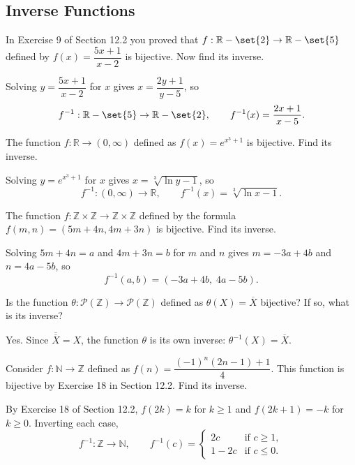\documentclass[DIN, pagenumber=false, fontsize=11pt, parskip=half]{scrartcl}
\begin{document}
\subsection{Inverse Functions}

\begin{problems}
    \problem In Exercise 9 of Section 12.2 you proved that $f : \mathbb{R} - \set{2} \to \mathbb{R} - \set{5}$ defined by $f(x) = \dfrac{5x+1}{x-2}$ is bijective. Now find its inverse.

    \answer Solving $y = \dfrac{5x+1}{x-2}$ for $x$ gives $x = \dfrac{2y+1}{y-5}$, so
    \[
        f^{-1} : \mathbb{R} - \set{5} \to \mathbb{R} - \set{2}, \qquad f^{-1}(x) = \dfrac{2x+1}{x-5}.
    \]

    \problem The function $f : \mathbb{R} \to (0,\infty)$ defined as $f(x) = e^{x^3+1}$ is bijective. Find its inverse.

    \answer Solving $y = e^{x^3+1}$ for $x$ gives $x = \sqrt[3]{\ln{y}-1}$, so
    \[
        f^{-1} : (0,\infty) \to \mathbb{R}, \qquad f^{-1}(x) = \sqrt[3]{\ln{x}-1}.
    \]

    \problem The function $f : \mathbb{Z} \times \mathbb{Z} \to \mathbb{Z} \times \mathbb{Z}$ defined by the formula $f(m,n) = (5m+4n, 4m+3n)$ is bijective. Find its inverse.

    \answer Solving $5m+4n = a$ and $4m+3n = b$ for $m$ and $n$ gives $m = -3a+4b$ and $n = 4a-5b$, so
    \[
        f^{-1}(a,b) = (-3a+4b,\; 4a-5b).
    \]

    \problem Is the function $\theta : \mathcal{P}(\mathbb{Z}) \to \mathcal{P}(\mathbb{Z})$ defined as $\theta(X) = \overline{X}$ bijective? If so, what is its inverse?

    \answer Yes. Since $\overline{\overline{X}} = X$, the function $\theta$ is its own inverse: $\theta^{-1}(X) = \overline{X}$.

    \problem Consider $f : \mathbb{N} \to \mathbb{Z}$ defined as $f(n) = \dfrac{(-1)^n(2n-1)+1}{4}$. This function is bijective by Exercise 18 in Section 12.2. Find its inverse.

    \answer By Exercise 18 of Section 12.2, $f(2k) = k$ for $k \geq 1$ and $f(2k+1) = -k$ for $k \geq 0$. Inverting each case,
    \[
        f^{-1} : \mathbb{Z} \to \mathbb{N}, \qquad
        f^{-1}(c) = \begin{cases}
            2c      & \text{if } c \geq 1,\\
            1 - 2c  & \text{if } c \leq 0.
        \end{cases}
    \]
\end{problems}
\end{document}
